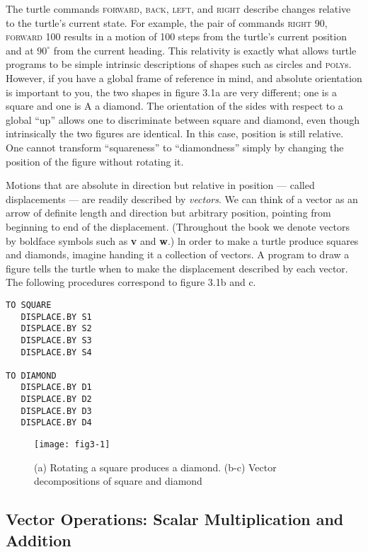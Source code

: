\documentclass{book}
\begin{document}
The turtle commands \textsc{forward}, \textsc{back}, \textsc{left}, and \textsc{right} describe changes
relative to the turtle's current state. For example, the pair of commands
\textsc{right} 90, \textsc{forward} 100 results in a motion of 100 steps from the turtle's
current position and at $90^{\circ}$ from the current heading. This relativity is
exactly what allows turtle programs to be simple intrinsic descriptions
of shapes such as circles and \textsc{poly}s. However, if you have a global frame
of reference in mind, and absolute orientation is important to you, the
two shapes in figure 3.1a are very different; one is a square and one is
A a diamond. The orientation of the sides with respect to a global ``up''
allows one to discriminate between square and diamond, even though
intrinsically the two figures are identical. In this case, position is still
relative. One cannot transform ``squareness'' to ``diamondness'' simply
by changing the position of the figure without rotating it.

Motions that are absolute in direction but relative in position --- called
displacements --- are readily described by {\em vectors}. We can think of a
vector as an arrow of definite length and direction but arbitrary position,
pointing from beginning to end of the displacement. (Throughout the
book we denote vectors by boldface symbols such as \textbf{v} and \textbf{w}.) ln order
to make a turtle produce squares and diamonds, imagine handing it
a collection of vectors. A program to draw a figure tells the turtle
when to make the displacement described by each vector. The following
procedures correspond to figure 3.1b and c.

\begin{verbatim}
TO SQUARE
   DISPLACE.BY S1
   DISPLACE.BY S2
   DISPLACE.BY S3
   DISPLACE.BY S4

TO DIAMOND
   DISPLACE.BY D1
   DISPLACE.BY D2
   DISPLACE.BY D3
   DISPLACE.BY D4
\end{verbatim}
\begin{figure}
\begin{center}
\texttt{[image: fig3-1]}
\caption{(a) Rotating a square produces a diamond. (b-c) Vector decompositions of square and diamond}
\end{center}
\end{figure}

\subsection{Vector Operations: Scalar Multiplication and Addition}
\end{document}
